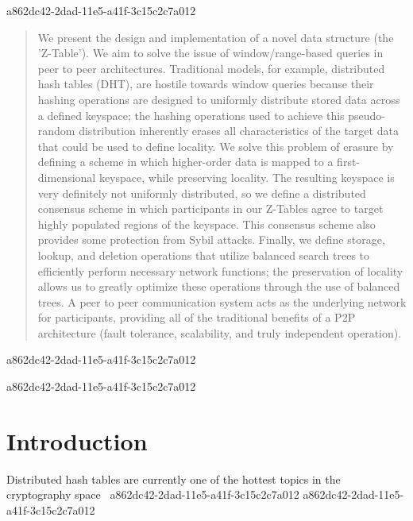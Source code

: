 \documentclass[12pt]{article}
\begin{document}
a862dc42-2dad-11e5-a41f-3c15c2c7a012
\maketitle

\begin{abstract}
We present the design and implementation of a novel data structure (the 'Z-Table'). We aim to solve the issue of window/range-based queries in peer to peer architectures. Traditional models, for example,  distributed hash tables (DHT), are hostile towards window queries because their hashing operations are designed to uniformly distribute stored data across a defined keyspace; the hashing operations used to achieve this pseudo-random distribution inherently erases all characteristics of the target data that could be used to define locality. We solve this problem of erasure by defining a scheme in which higher-order data is mapped to a first-dimensional keyspace, while preserving locality. The resulting keyspace is very definitely not uniformly distributed, so we define a distributed consensus scheme in which participants in our Z-Tables agree to target highly populated regions of the keyspace. This consensus scheme also provides some protection from Sybil attacks. Finally, we define storage, lookup, and deletion operations that utilize balanced search trees to efficiently perform necessary network functions; the preservation of locality allows us to greatly optimize these operations through the use of balanced trees. A peer to peer communication system acts as the underlying network for participants, providing all of the traditional benefits of a P2P architecture (fault tolerance, scalability, and truly independent operation).
\end{abstract}
a862dc42-2dad-11e5-a41f-3c15c2c7a012

\newpage
a862dc42-2dad-11e5-a41f-3c15c2c7a012\section{Introduction}
Distributed hash tables are currently one of the hottest topics in the cryptography space~\cite{Stoica:2001dj,Rowstron:2001ea,Ratnasamy:2001wn}
a862dc42-2dad-11e5-a41f-3c15c2c7a012
\printbibliography
a862dc42-2dad-11e5-a41f-3c15c2c7a012
\end{document}
